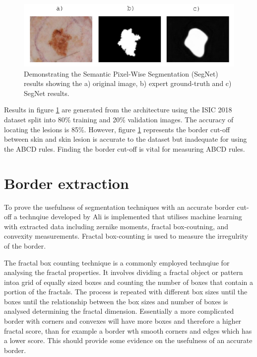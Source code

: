 \begin{figure}[hb]
\centering
\includegraphics[scale=1.2]{images/border-seg.png}
\caption{Demonstrating the Semantic Pixel-Wise Segmentation (SegNet) results showing the a) original image, b) expert ground-truth and c) SegNet results.} \label{SegNet}
\end{figure}

Results in figure \ref{SegNet} are generated from the architecture using the ISIC 2018 dataset split into 80\% training and 20\% validation images. The accuracy of locating the lesions is 85\%. However, figure \ref{SegNet} represents the border cut-off between skin and skin lesion is accurate to the dataset but inadequate for using the ABCD rules. Finding the border cut-off is vital for measuring ABCD rules\cite{Pereira2020}.

\section{Border extraction}
To prove the usefulness of segmentation techniques with an accurate border cut-off a technqiue developed by Ali\cite{Ali2020b} is implemented that utilises machine learning with extracted data including zernike moments, fractal box-coutning, and convexity measurements. Fractal box-counting is used to measure the irregulrity of the border.

The fractal box counting technique is a commonly employed technqiue for analysing the fractal properties. It involves dividing a fractal object or pattern intoa  grid of equally sized boxes and counting the number of boxes that contain a portion of the fractals. The process is repeated with different box sizes until the boxes until the relationship between the box sizes and number of boxes is analysed determining the fractal dimension\cite{Hamburger1996}. Essentially a more complicated border with corners and convexes will have more boxes and therefore a higher fractal score, than for example a border wth smooth corners and edges which has a lower score. This should provide some evidence on the usefulness of an accurate border.

